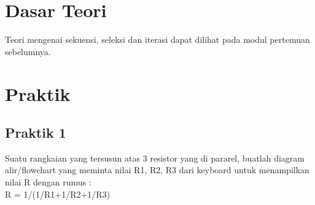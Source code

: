 \documentclass[a4paper,12pt]{article}
\begin{document}
\section{Dasar Teori}
Teori mengenai sekuensi, seleksi dan iterasi dapat dilihat pada modul pertemuan sebelumnya.

\newpage

\section{Praktik}
\subsection{Praktik 1}
Suatu rangkaian yang tersusun atas 3 resistor yang di pararel, buatlah diagram alir/flowchart yang meminta nilai R1, R2, R3 dari keyboard untuk menampilkan nilai
R dengan rumus :\\
R = 1/(1/R1+1/R2+1/R3)
\end{document}
